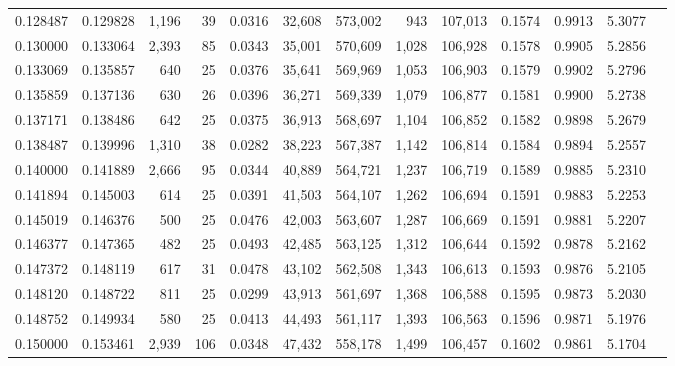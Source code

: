 \begin{tabular}{rrrrrrrrrrrrr}
0.128487 & 0.129828 & 1,196 &  39 &                                     0.0316 &  32,608 & 573,002 &     943 & 107,013 & 0.1574 & 0.9913 & 5.3077 \\
0.130000 & 0.133064 & 2,393 &  85 &                                     0.0343 &  35,001 & 570,609 &   1,028 & 106,928 & 0.1578 & 0.9905 & 5.2856 \\
0.133069 & 0.135857 &   640 &  25 &                                     0.0376 &  35,641 & 569,969 &   1,053 & 106,903 & 0.1579 & 0.9902 & 5.2796 \\
0.135859 & 0.137136 &   630 &  26 &                                     0.0396 &  36,271 & 569,339 &   1,079 & 106,877 & 0.1581 & 0.9900 & 5.2738 \\
0.137171 & 0.138486 &   642 &  25 &                                     0.0375 &  36,913 & 568,697 &   1,104 & 106,852 & 0.1582 & 0.9898 & 5.2679 \\
0.138487 & 0.139996 & 1,310 &  38 &                                     0.0282 &  38,223 & 567,387 &   1,142 & 106,814 & 0.1584 & 0.9894 & 5.2557 \\
0.140000 & 0.141889 & 2,666 &  95 &                                     0.0344 &  40,889 & 564,721 &   1,237 & 106,719 & 0.1589 & 0.9885 & 5.2310 \\
0.141894 & 0.145003 &   614 &  25 &                                     0.0391 &  41,503 & 564,107 &   1,262 & 106,694 & 0.1591 & 0.9883 & 5.2253 \\
0.145019 & 0.146376 &   500 &  25 &                                     0.0476 &  42,003 & 563,607 &   1,287 & 106,669 & 0.1591 & 0.9881 & 5.2207 \\
0.146377 & 0.147365 &   482 &  25 &                                     0.0493 &  42,485 & 563,125 &   1,312 & 106,644 & 0.1592 & 0.9878 & 5.2162 \\
0.147372 & 0.148119 &   617 &  31 &                                     0.0478 &  43,102 & 562,508 &   1,343 & 106,613 & 0.1593 & 0.9876 & 5.2105 \\
0.148120 & 0.148722 &   811 &  25 &                                     0.0299 &  43,913 & 561,697 &   1,368 & 106,588 & 0.1595 & 0.9873 & 5.2030 \\
0.148752 & 0.149934 &   580 &  25 &                                     0.0413 &  44,493 & 561,117 &   1,393 & 106,563 & 0.1596 & 0.9871 & 5.1976 \\
0.150000 & 0.153461 & 2,939 & 106 &                                     0.0348 &  47,432 & 558,178 &   1,499 & 106,457 & 0.1602 & 0.9861 & 5.1704 \\

\end{tabular}
